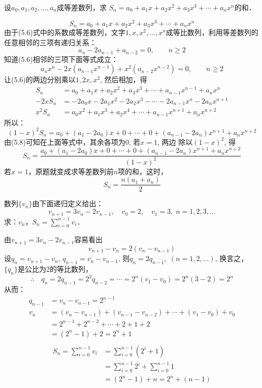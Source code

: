 \begin{example}
设$a_0,a_1,a_2,\ldots,a_n$成等差数列，求
$S_n=a_0+a_1x+a_2x^2+a_3x^3+\cdots+a_nx^n$的和．    
\end{example}

\begin{solution}
    \begin{equation}
        S_n=a_0+a_1x+a_2x^2+a_3x^3+\cdots+a_nx^n
    \end{equation}
由于(5.6)式中的系数成等差数列，文字$1,x,x^2,\ldots,x^n$成等比数列，利用等差数列的任意相邻的三项有递归关系：
\begin{equation}
    a_n-2a_{n-1}+a_{n-2}=0,\qquad n\ge 2
\end{equation}
知道(5.6)相邻的三项下面等式成立：
\begin{equation}
    a_nx^n-2x(a_{n-1}x^{n-1})+x^2(a_{n-2}x^{n-2})=0,\qquad n\ge 2
\end{equation}
让(5.6)的两边分别乘以$1,2x,x^2$, 然后相加，得
\[\begin{split}
    S_n&=a_0+a_1x+a_2x^2+a_3x^3+\cdots+a_{n-1}x^{n-1}+a_nx^n\\
    -2xS_n&=-2a_0x-2a_1x^2-2a_2x^3-\cdots-2a_{n-1}x^n-2a_nx^{n+1}\\
    x^2S_n&=a_0x^2+a_1x^3+a_2x^4+\cdots+a_{n-1}x^{n+1}+a_nx^{n+2}
\end{split}\]
所以：
\[(1-x)^2 S_n=a_0+(a_1-2a_0)x+0+\cdots+0+(a_{n-1}-2a_n)x^{n+1}+a_nx^{n+2}\]
由(5.8)可知在上面等式中，其余各项为0, 若$x=1$, 两边
除以$(1-x)^2$, 得
\[S_n=\frac{a_0+(a_1-2a_0)x+0+\cdots+0+(a_{n-1}-2a_n)x^{n+1}+a_nx^{n+2}}{(1-x)^2}\]
若$x=1$，原题就变成求等差数列前$n$项的和，这时，
\[S_n=\frac{n(a_1+a_n)}{2}\]
\end{solution}

\begin{example}
    数列$\{v_n\}$由下面递归定义给出：
 \[   v_{n+1}=3v_n-2v_{n-1},\quad v_0=2,\quad v_1=3,\; n=1,2,3,\ldots\]
 求：$v_n$，$S_n=\sum^{n-1}_{i=0}v_i$．
\end{example}

\begin{solution}
    由$v_{n+1}=3v_n-2v_{n-1}$容易看出
  \[  v_{n+1}-v_{n}=2(v_n-v_{n-1})\]
    设$q_n=v_{n+1}-v_n$, $q_{n-1}=v_n-v_{n-1}$, 则$q_n=2q_{n-1},\; (n=1,2,\ldots)$, 换言之，$\{q_n\}$是公比为2的等比数列，
\[\therefore\quad q_n=2q_{n-1}=2^2q_{n-2}=\cdots=2^n(v_1-v_0)=2^n(3-2)=2^n\]
从而：
\[\begin{split}
    q_{n-1}&=v_n-v_{n-1}=2^{n-1}\\
v_n&=(v_n-v_{n-1})+(v_{n-1}-v_{n-2})+\cdots+(v_1-v_0)+v_0\\
&=2^{n-1}+2^{n-2}+\cdots +2+1+2\\
&=(2^n-1)+2=2^n+1\\
\end{split}\]
\[\begin{split}
    S_n=\sum^{n-1}_{i=0}v_i&=\sum^{n-1}_{i=0}(2^i+1)\\
    &=\sum^{n-1}_{i=0}2^i+\sum^{n-1}_{i=0}1\\
    &=(2^n-1)+n=2^n+(n-1)
\end{split}\]
\end{solution}

